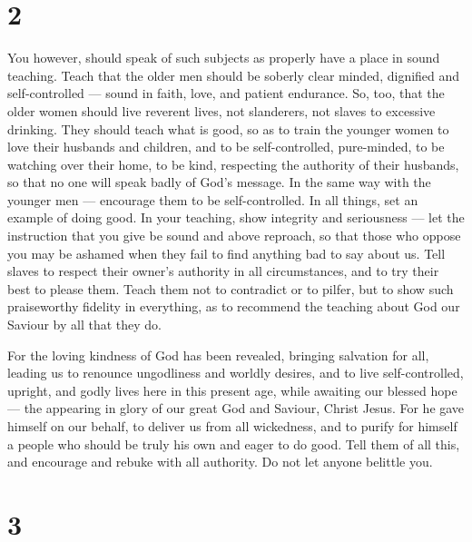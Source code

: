 \hypertarget{section-1}{%
\section{2}\label{section-1}}

 You however, should speak of such subjects as properly have
a place in sound teaching.  Teach that the older men should
be soberly clear minded, dignified and self-controlled --- sound in
faith, love, and patient endurance.  So, too, that the older
women should live reverent lives, not slanderers, not slaves to
excessive drinking.  They should teach what is good, so as
to train the younger women to love their husbands and children,
 and to be self-controlled, pure-minded, to be watching over
their home, to be kind, respecting the authority of their husbands, so
that no one will speak badly of God's message.  In the same
way with the younger men --- encourage them to be self-controlled.
 In all things, set an example of doing good. In your
teaching, show integrity and seriousness ---  let the
instruction that you give be sound and above reproach, so that those who
oppose you may be ashamed when they fail to find anything bad to say
about us.  Tell slaves to respect their owner's authority in
all circumstances, and to try their best to please them. 
Teach them not to contradict or to pilfer, but to show such praiseworthy
fidelity in everything, as to recommend the teaching about God our
Saviour by all that they do.

 For the loving kindness of God has been revealed, bringing
salvation for all,  leading us to renounce ungodliness and
worldly desires, and to live self-controlled, upright, and godly lives
here in this present age,  while awaiting our blessed hope
--- the appearing in glory of our great God and Saviour, Christ Jesus.
 For he gave himself on our behalf, to deliver us from all
wickedness, and to purify for himself a people who should be truly his
own and eager to do good.  Tell them of all this, and
encourage and rebuke with all authority. Do not let anyone belittle you.

\hypertarget{section-2}{%
\section{3}\label{section-2}}

